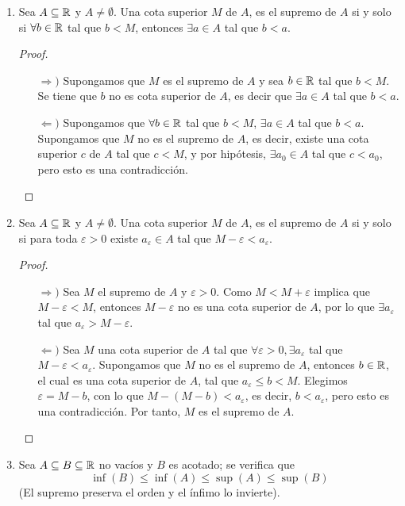 \begin{enumerate}[label=\alph*)]
 \item Sea $A\subseteq \mathbb{R}$ y $A\neq \emptyset$. Una cota superior $M$ de $A$, es el supremo de $A$ si y solo si $\forall b\in \mathbb{R}$ tal que $b<M$, entonces $\exists a\in A$ tal que $b<a$.
 \begin{proof}\leavevmode
 \begin{itemize}
 \item[$\Rightarrow)$] Supongamos que $M$ es el supremo de $A$ y sea $b\in \mathbb{R}$ tal que $b<M$. Se tiene que $b$ no es cota superior de $A$, es decir que $\exists a\in A$ tal que $b<a$.
 \item[$\Leftarrow)$] Supongamos que $\forall b\in \mathbb{R}$ tal que $b<M$, $\exists a\in A$ tal que $b<a$. Supongamos que $M$ no es el supremo de $A$, es decir, existe una cota superior $c$ de $A$ tal que $c<M$, y por hipótesis, $\exists a_0\in A$ tal que $c<a_0$, pero esto es una contradicción. \qedhere
 \end{itemize}
 \end{proof}

 \item Sea $A\subseteq \mathbb{R}$ y $A\neq \emptyset$. Una cota superior $M$ de $A$, es el supremo de $A$ si y solo si para toda $\varepsilon>0$ existe $a_\varepsilon \in A$ tal que $M-\varepsilon<a_\varepsilon$.

  \begin{proof}\leavevmode
  \begin{itemize}
  \item[$\Rightarrow)$] Sea $M$ el supremo de $A$ y $\varepsilon>0$. Como $M<M+\varepsilon$ implica que $M-\varepsilon<M$, entonces $M-\varepsilon$ no es una cota superior de $A$, por lo que $\exists a_\varepsilon$ tal que $a_\varepsilon>M-\varepsilon$.
  \item[$\Leftarrow)$] Sea $M$ una cota superior de $A$ tal que $\forall \varepsilon>0, \exists a_{\varepsilon}$ tal que $M-\varepsilon<a_{\varepsilon}$. Supongamos que $M$ no es el supremo de $A$, entonces $b\in \mathbb{R}$, el cual es una cota superior de $A$, tal que $a_\varepsilon \leq b < M$. Elegimos $\varepsilon = M-b$, con lo que $M-(M-b)<a_\varepsilon$, es decir, $b<a_{\varepsilon}$, pero esto es una contradicción. Por tanto, $M$ es el supremo de $A$. \qedhere
  \end{itemize}
  \end{proof}
  
\item Sea $A\subseteq B\subseteq \mathbb{R}$ no vacíos y $B$ es acotado; se verifica que \[\inf (B) \leq \inf (A) \leq \sup (A) \leq \sup (B)\] (El supremo preserva el orden y el ínfimo lo invierte).


\end{enumerate}
